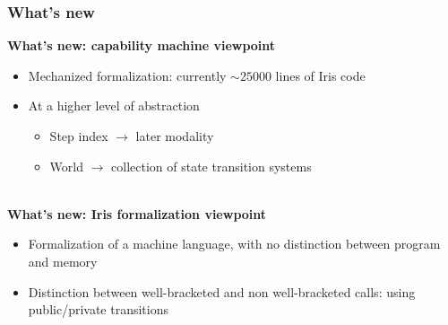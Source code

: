 \documentclass{beamer}
\begin{document}

\begin{frame}
\frametitle{What's new}

\textbf{What's new: capability machine viewpoint}

\begin{itemize}
	\item Mechanized formalization: currently $\sim 25 000$ lines of Iris code
	\item At a higher level of abstraction
	\begin{itemize}
		\item<2-> Step index $\rightarrow$ later modality
		\item<3-> World $\rightarrow$ collection of state transition systems
	\end{itemize}
\end{itemize}

~\\[0.5em]
\textbf{What's new: Iris formalization viewpoint}
\begin{itemize}
	\item Formalization of a machine language, with no distinction between program and memory
	\item Distinction between well-bracketed and non well-bracketed calls: using public/private transitions
\end{itemize}

\end{frame}

\end{document}

